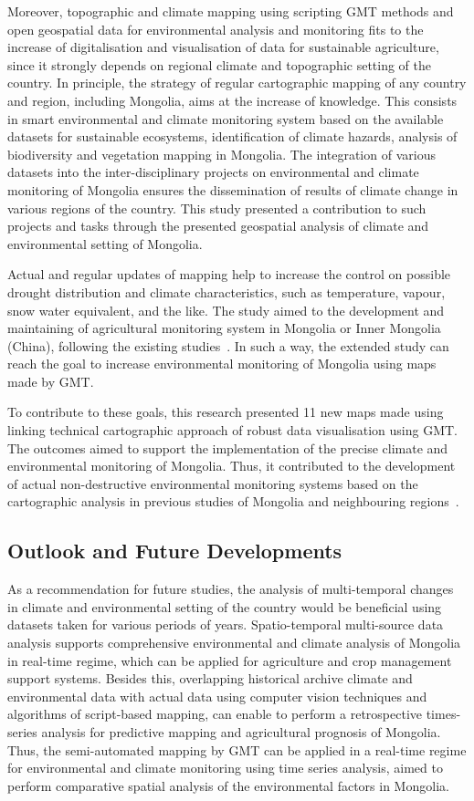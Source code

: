 \documentclass[geosciences,article,accept,pdftex,oneauthor]{Definitions/mdpi}
\begin{document}
Moreover, topographic and climate mapping using scripting GMT methods and open geospatial data for environmental analysis and monitoring fits to the increase of digitalisation and visualisation of data for sustainable agriculture, since it strongly depends on regional climate and topographic setting of the country. In principle, the strategy of regular cartographic mapping of any country and region, including Mongolia, aims at the increase of knowledge. This consists in smart environmental and climate monitoring system based on the available datasets for sustainable ecosystems, identification of climate hazards, analysis of biodiversity and vegetation mapping in Mongolia. The integration of various datasets into the inter-disciplinary projects on environmental and climate monitoring of Mongolia ensures the dissemination of results of climate change in various regions of the country. This study presented a contribution to such projects and tasks through the presented geospatial analysis of climate and environmental setting of Mongolia.

Actual and regular updates of mapping help to increase the control on possible drought distribution and climate characteristics, such as temperature, vapour, snow water equivalent, and the like. The study aimed to the development and maintaining of agricultural monitoring system in Mongolia or Inner Mongolia (China), following the existing studies~\cite{Rina,Long,Zheng}. In such a way, the extended study can reach the goal to increase environmental monitoring of Mongolia using maps made by GMT.

To contribute to these goals, this research presented 11 new maps made using linking technical cartographic approach of robust data visualisation using GMT. The outcomes aimed to support the implementation of the precise climate and environmental monitoring of Mongolia. Thus, it contributed to the development of actual non-destructive environmental monitoring systems based on the cartographic analysis in previous studies of Mongolia and neighbouring regions~\cite{MENG2021107908,DASHPUREV2021108331,SAINNEMEKH2022104654,Batunacun}. 

\subsection{Outlook and Future Developments}
As a recommendation for future studies, the analysis of multi-temporal changes in climate and environmental setting of the country would be beneficial using datasets taken for various periods of years. Spatio-temporal multi-source data analysis supports comprehensive environmental and climate analysis of Mongolia in real-time regime, which can be applied for agriculture and crop management support systems. Besides this, overlapping historical archive climate and environmental data with actual data using computer vision techniques and algorithms of {script-based} mapping, can enable to perform a retrospective times-series analysis for predictive mapping and agricultural prognosis of Mongolia. Thus, the semi-automated mapping by GMT can be applied in a real-time regime for environmental and climate monitoring using time series analysis, {aimed to perform comparative spatial analysis of the environmental factors in Mongolia}.
\end{document}
